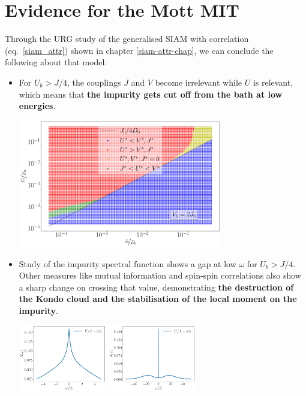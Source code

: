 \documentclass{report}
\numberwithin{equation}{section}
\begin{document}
\section{Evidence for the Mott MIT}
Through the URG study of the generalised SIAM with correlation (eq.~\ref{siam_attr}) shown in chapter \ref{siam-attr-chap}, we can conclude the following about that model:
\begin{itemize}
	\item For \(U_b > J/4\), the couplings \(J\) and \(V\) become irrelevant while \(U\) is relevant, which means that \textbf{the impurity gets cut off from the bath at low energies}.
\begin{center}
	\includegraphics[width=0.7\textwidth]{../figures/phase-map_D=1000.pdf}
\end{center}
	\item Study of the impurity spectral function shows a gap at low \(\omega\) for \(U_b > J/4\). Other measures like mutual information and spin-spin correlations also show a sharp change on crossing that value, demonstrating \textbf{the destruction of the Kondo cloud and the stabilisation of the local moment on the impurity}.
\begin{center}
	\includegraphics[width=0.3\textwidth]{../figures/spec_func_U_by_J=0.00.pdf}
	\includegraphics[width=0.3\textwidth]{../figures/spec_func_U_by_J=4.00.pdf}

\end{center}
\end{itemize}
\end{document}
